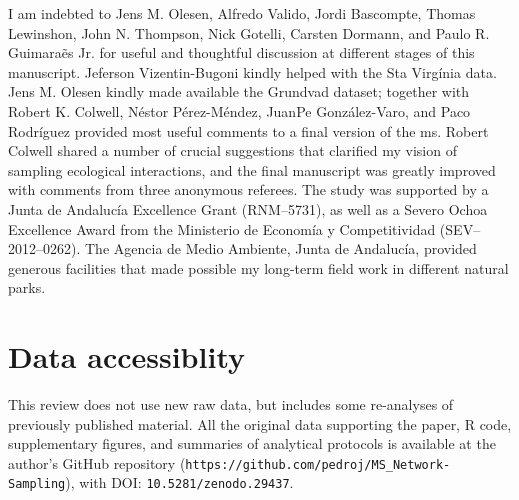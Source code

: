 \documentclass[12pt]{article}
\begin{document}
I am indebted to Jens M. Olesen, Alfredo Valido, Jordi Bascompte, Thomas Lewinshon, John N. Thompson, Nick Gotelli, Carsten Dormann, and Paulo R. Guimara\~es Jr. for useful and thoughtful discussion at different stages of this manuscript. Jeferson Vizentin-Bugoni kindly helped with the Sta Virg\'inia data. Jens M. Olesen kindly made available the Grundvad dataset; together with Robert K. Colwell, N\'estor P\'erez-M\'endez, JuanPe Gonz\'alez-Varo, and Paco Rodr\'iguez provided most useful comments to a final version of the ms. Robert Colwell shared a number of crucial suggestions that clarified my vision of sampling ecological interactions, and the final manuscript was greatly improved with comments from three anonymous referees. The study was supported by a Junta de Andaluc\'ia Excellence Grant (RNM--5731), as well as a Severo Ochoa Excellence Award from the Ministerio de Econom\'ia y Competitividad (SEV--2012--0262). The Agencia de Medio Ambiente, Junta de Andaluc\'ia, provided generous facilities that made possible my long-term field work in different natural parks.
\section*{Data accessiblity}
This review does not use new raw data, but includes some re-analyses of previously published material. All the original data supporting the paper, R code, supplementary figures, and summaries of analytical protocols is available at the author's GitHub repository (\texttt{https://github.com/pedroj/MS\_Network-Sampling}), with DOI: \texttt{10.5281/zenodo.29437}.
\newpage
\end{document}
